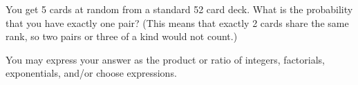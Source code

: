 \documentclass[12pt]{article}
\begin{document}
\begin{problem}{10}
    You get 5 cards at random from a standard 52 card deck. What is the probability that
    you have exactly one pair? (This means that exactly 2 cards share the same rank, so two pairs or three of
    a kind would not count.)

    You may express your answer as the product or ratio of integers, factorials, exponentials, and/or choose expressions.


\end{problem}
\newpage

\end{document}
